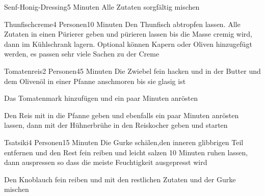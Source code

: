 \begin{recipe}{Senf-Honig-Dressing}{}{5 Minuten}
Alle Zutaten sorgfältig mischen
\end{recipe}


\begin{recipe}{Thunfischcreme}{4 Personen}{10 Minuten}
Den Thunfisch abtropfen lassen.
Alle Zutaten in einen Pürierer geben und pürieren lassen bis die Masse cremig wird, dann im Kühlschrank lagern.
Optional können Kapern oder Oliven hinzugefügt werden, es passen sehr viele Sachen zu der Creme
\end{recipe} 


\begin{recipe}{Tomatenreis}{2 Personen}{45 Minuten}
Die Zwiebel fein hacken und in der Butter und dem Olivenöl in einer Pfanne anschmoren bis sie glasig ist

Das Tomatenmark hinzufügen und ein paar Minuten anrösten

Den Reis mit in die Pfanne geben und ebenfalls ein paar Minuten anrösten lassen, dann mit der Hühnerbrühe in den Reiskocher geben und starten
\end{recipe}


\begin{recipe}{Tsatsiki}{4 Personen}{15 Minuten}
Die Gurke schälen,den inneren glibbrigen Teil entfernen und den Rest fein reiben und leicht salzen
10 Minuten ruhen lassen, dann auspressen so dass die meiste Feuchtigkeit ausgepresst wird

Den Knoblauch fein reiben und mit den restlichen Zutaten und der Gurke mischen
\end{recipe}

